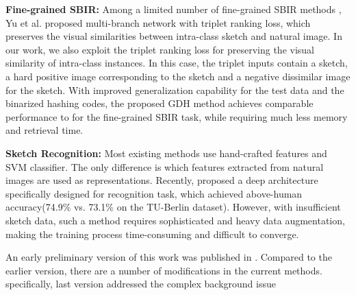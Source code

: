 \noindent\textbf{Fine-grained SBIR:} Among a limited number of fine-grained SBIR methods \cite{Yu2016shoes,SangkloyBHH16,SongYSXH17,BuiRPC16,XuYHSMWXKG18,LiPSHZH16,QiSZL16,XuYQSMWG16,LiPSHXZ17}, Yu et al. \cite{Yu2016shoes} proposed multi-branch network with triplet ranking loss, which preserves the visual similarities between intra-class sketch and natural image. In our work, we also exploit the triplet ranking loss for preserving the visual similarity of intra-class instances. 
In this case, the triplet inputs
contain a sketch, a hard positive image corresponding to the sketch and a negative dissimilar image for the sketch.
With improved generalization capability for the test data and the binarized hashing codes, the proposed GDH method achieves comparable performance to \cite{Yu2016shoes} for the fine-grained SBIR task, while requiring much less memory and retrieval time. 

\noindent\textbf{Sketch Recognition:} Most existing methods\cite{EitzHA12,SimonyanZ14a} use hand-crafted
features and SVM classifier. The only difference is which features
extracted from natural images are used as representations. Recently, \cite{sketchanet}
proposed a deep architecture specifically designed for recognition task, which achieved above-human accuracy(74.9\% vs. 73.1\% on the TU-Berlin dataset).
However, with insufficient sketch data, such a method requires sophisticated and heavy data augmentation, making the training process time-consuming and difficult to converge.



An early preliminary version of this work was published
in \cite{GDH}. Compared to the earlier version, there are a number of
modifications in the current methods.
specifically,  last version addressed the complex background issue 